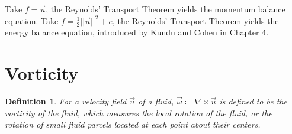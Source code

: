 \documentclass[11pt]{book}
\theoremstyle{break}
\theoremstyle{break}
\newtheorem{defn}{Definition}[corL]
\begin{document}
Take $f = \vec{u}$, the Reynolds' Transport Theorem yields the momentum balance equation. Take $f = \frac{1}{2}||\vec{u}||^2 + e$, the Reynolds' Transport Theorem yields the energy balance equation, introduced by Kundu and Cohen in Chapter 4. \\


\newpage
\section[Vorticity]{\color{red}Vorticity\color{black}}
\begin{defn}
For a velocity field $\vec{u}$ of a fluid, $\vec{\omega} \coloneqq \nabla \times \vec{u}$ is defined to be the vorticity of the fluid, which measures the local rotation of the fluid, or the rotation of small fluid parcels located at each point about their centers. 
\end{defn}
\end{document}
